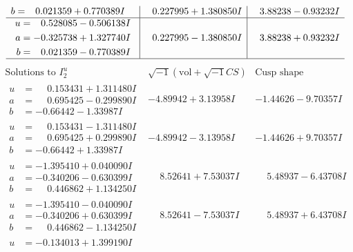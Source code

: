 \documentclass[1p]{elsarticle_modified}
\theoremstyle{definition}
\newcommand{\I}{\sqrt{-1}}
\begin{document}
$$\begin{array}{c|c|c}
\begin{aligned}
b &= \phantom{-}0.021359 + 0.770389 I\end{aligned}
 & \phantom{-}0.227995 + 1.380850 I & \phantom{-}3.88238 - 0.93232 I \\ \hline\begin{aligned}
u &= \phantom{-}0.528085 - 0.506138 I \\
a &= -0.325738 + 1.327740 I \\
b &= \phantom{-}0.021359 - 0.770389 I\end{aligned}
 & \phantom{-}0.227995 - 1.380850 I & \phantom{-}3.88238 + 0.93232 I\\
 \hline 
 \end{array}$$\newpage$$\begin{array}{c|c|c}  
\text{Solutions to }I^u_{2}& \I (\text{vol} + \sqrt{-1}CS) & \text{Cusp shape}\\
 \hline 
\begin{aligned}
u &= \phantom{-}0.153431 + 1.311480 I \\
a &= \phantom{-}0.695425 - 0.299890 I \\
b &= -0.66442 - 1.33987 I\end{aligned}
 & -4.89942 + 3.13958 I & -1.44626 - 9.70357 I \\ \hline\begin{aligned}
u &= \phantom{-}0.153431 - 1.311480 I \\
a &= \phantom{-}0.695425 + 0.299890 I \\
b &= -0.66442 + 1.33987 I\end{aligned}
 & -4.89942 - 3.13958 I & -1.44626 + 9.70357 I \\ \hline\begin{aligned}
u &= -1.395410 + 0.040090 I \\
a &= -0.340206 - 0.630399 I \\
b &= \phantom{-}0.446862 + 1.134250 I\end{aligned}
 & \phantom{-}8.52641 + 7.53037 I & \phantom{-}5.48937 - 6.43708 I \\ \hline\begin{aligned}
u &= -1.395410 - 0.040090 I \\
a &= -0.340206 + 0.630399 I \\
b &= \phantom{-}0.446862 - 1.134250 I\end{aligned}
 & \phantom{-}8.52641 - 7.53037 I & \phantom{-}5.48937 + 6.43708 I \\ \hline\begin{aligned}
u &= -0.134013 + 1.399190 I \\

\end{aligned}
\end{array}$$
\end{document}
